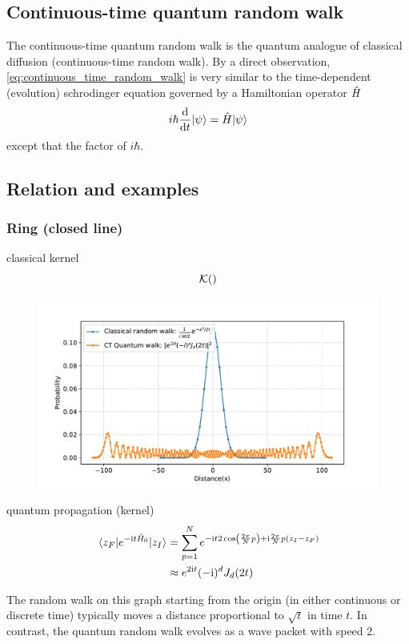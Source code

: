 \subsection{Continuous-time quantum random walk}
The continuous-time quantum random walk \cite{childsExampleDifferenceQuantum2002} is the quantum analogue of classical diffusion (continuous-time random walk).
By a direct observation, \cref{eq:continuous_time_random_walk} is very similar to the time-dependent (evolution) schrodinger equation governed by a Hamiltonian operator $\hat{H}$
\begin{equation}
	i\hbar \dv{t} | \psi \rangle = \hat{H} | \psi \rangle
\end{equation}
except that the factor of $i\hbar$.
\begin{definition}
	
\end{definition}

\subsection{Relation and examples}
\subsubsection{Ring (closed line)}
classical kernel 
\begin{equation}
	\mathcal{K}()
\end{equation}
\begin{figure}[!ht]
	\centering
	\includegraphics[width=.8\linewidth]{walk_1d.pdf}
	\caption{}
\end{figure}
quantum propagation (kernel)
\begin{align}
	\mel{z_F}{e^{-\textup{i}t\hat{H}_0 }}{z_I}
	&=\sum_{p=1}^{N} 
	e^{-\textup{i} t 2\cos(\frac{2\pi}{N}p) +\textup{i} \frac{2\pi}{N} p(z_I-z_F)} 
	\\
	&
	\approx e^{2\textup{i} t} (-\textup{i})^{d} J_{d} (2t)
	\label{eq:ctqrw_kernel}
\end{align}
\begin{remark}
    The random walk on this graph starting from the origin (in either continuous or discrete time)
    typically moves a distance proportional to $\sqrt{t}$ in time $t$.
	In contrast, the quantum random walk evolves as a wave packet with speed 2.
\end{remark}


